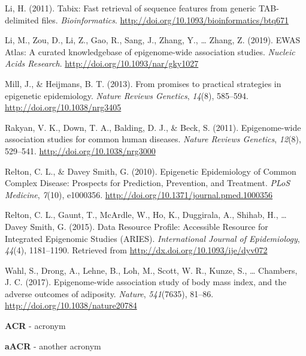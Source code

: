 \documentclass[11pt,twoside]{bristolthesis}
\newlength{\cslhangindent}
\newenvironment{cslreferences}%
  {\setlength{\parindent}{0pt}%
  \everypar{\setlength{\hangindent}{\cslhangindent}}\ignorespaces}%
  {\par}
\begin{document}
\begin{cslreferences}
\leavevmode\hypertarget{ref-Li2011}{}%
Li, H. (2011). Tabix: Fast retrieval of sequence features from generic TAB-delimited files. \emph{Bioinformatics}. \url{http://doi.org/10.1093/bioinformatics/btq671}

\leavevmode\hypertarget{ref-Li2019}{}%
Li, M., Zou, D., Li, Z., Gao, R., Sang, J., Zhang, Y., \ldots{} Zhang, Z. (2019). EWAS Atlas: A curated knowledgebase of epigenome-wide association studies. \emph{Nucleic Acids Research}. \url{http://doi.org/10.1093/nar/gky1027}

\leavevmode\hypertarget{ref-Mill2013}{}%
Mill, J., \& Heijmans, B. T. (2013). From promises to practical strategies in epigenetic epidemiology. \emph{Nature Reviews Genetics}, \emph{14}(8), 585--594. \url{http://doi.org/10.1038/nrg3405}

\leavevmode\hypertarget{ref-Rakyan2011}{}%
Rakyan, V. K., Down, T. A., Balding, D. J., \& Beck, S. (2011). Epigenome-wide association studies for common human diseases. \emph{Nature Reviews Genetics}, \emph{12}(8), 529--541. \url{http://doi.org/10.1038/nrg3000}

\leavevmode\hypertarget{ref-Relton2010}{}%
Relton, C. L., \& Davey Smith, G. (2010). Epigenetic Epidemiology of Common Complex Disease: Prospects for Prediction, Prevention, and Treatment. \emph{PLoS Medicine}, \emph{7}(10), e1000356. \url{http://doi.org/10.1371/journal.pmed.1000356}

\leavevmode\hypertarget{ref-Relton2015}{}%
Relton, C. L., Gaunt, T., McArdle, W., Ho, K., Duggirala, A., Shihab, H., \ldots{} Davey Smith, G. (2015). Data Resource Profile: Accessible Resource for Integrated Epigenomic Studies (ARIES). \emph{International Journal of Epidemiology}, \emph{44}(4), 1181--1190. Retrieved from \url{http://dx.doi.org/10.1093/ije/dyv072}

\leavevmode\hypertarget{ref-Wahl2017}{}%
Wahl, S., Drong, A., Lehne, B., Loh, M., Scott, W. R., Kunze, S., \ldots{} Chambers, J. C. (2017). Epigenome-wide association study of body mass index, and the adverse outcomes of adiposity. \emph{Nature}, \emph{541}(7635), 81--86. \url{http://doi.org/10.1038/nature20784}
\end{cslreferences}
  \begin{abbreviations}
    \textbf{ACR} - acronym

    \textbf{aACR} - another acronym
  \end{abbreviations}
\end{document}

